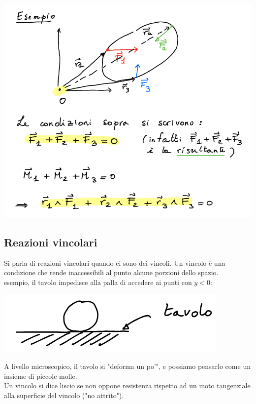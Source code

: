 \documentclass{subfiles}
\begin{document}
\includegraphics[width=\columnwidth]{esempio-enunciato-principale-della-statica}

\subsection{Reazioni vincolari}

Si parla di reazioni vincolari quando ci sono dei vincoli.
Un vincolo è una condizione che rende inaccessibili al punto alcune porzioni dello spazio.\\

\noindent
esempio, il tavolo impedisce alla palla di accedere ai punti con $y < 0$:

\includegraphics[width=\columnwidth]{esempio-reazione-vincolare}

\noindent
A livello microscopico, il tavolo si "deforma un po'", e possiamo pensarlo come un insieme di piccole molle.\\

\noindent
Un vincolo si dice liscio se non oppone resistenza rispetto ad un moto tangenziale alla superficie del vincolo ("no attrito").
\end{document}

